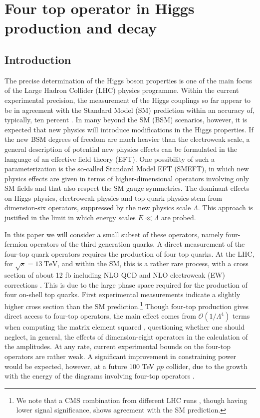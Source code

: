 

\chapter{ Four top operator in Higgs production and decay}\label{chap:4topSingleHiggs}

\section{Introduction}

The precise determination of the Higgs boson properties is one of the main focus of the Large Hadron Collider (LHC) physics programme. Within the current experimental precision, the measurement of the Higgs couplings so far appear to be in agreement with the Standard Model (SM) prediction within an accuracy of, typically, ten percent \cite{Aad:2019mbh, Sirunyan:2018koj}. In many beyond the SM (BSM) scenarios, however, it is expected that new physics will introduce modifications in the Higgs properties. 
%
If the new BSM degrees of freedom are much heavier than the electroweak scale, a general description of potential new physics effects can be formulated in the language of an effective field theory (EFT). One possibility of such a parameterization is the so-called Standard Model EFT (SMEFT), in which new physics effects are given in terms of higher-dimensional operators involving only SM fields and that also respect the SM gauge symmetries.  The dominant effects on Higgs physics, electroweak physics and top quark physics stem from dimension-six operators, suppressed by the new physics scale $\Lambda$. This approach is justified in the limit 
in which energy scales $E\ll \Lambda$ are probed. 
\par
In this paper we will consider a small subset of these operators, namely four-fermion operators of the third generation quarks.
A direct measurement of the four-top quark operators requires the production of four top quarks. At the LHC, for $\sqrt{s}=13\;\text{TeV}$, and within the SM, this is a rather rare process, with a cross section of about 12 fb including NLO QCD and NLO electroweak (EW) corrections \cite{Frederix:2017wme}. This is due to the large phase space required for the production of four on-shell top quarks. First experimental measurements \cite{Aad:2020klt} indicate a slightly higher cross section than the SM prediction.\footnote{We note that a CMS combination from different LHC runs \cite{Sirunyan:2019nxl}, though having lower signal significance, shows agreement with the SM prediction.} Though four-top production gives direct access to four-top operators, the main effect comes from $\mathcal{O}(1/\Lambda^4)$ terms when computing the matrix element squared \cite{Hartland:2019bjb}, questioning whether one should neglect, in general, the effects of dimension-eight operators in the calculation of the amplitudes. At any rate, current experimental bounds on the four-top operators are rather weak. A significant improvement in constraining power would be expected, however, at a future 100 TeV $pp$ collider, due to the growth with the energy of the diagrams involving four-top operators \cite{Banelli:2020iau}. 
